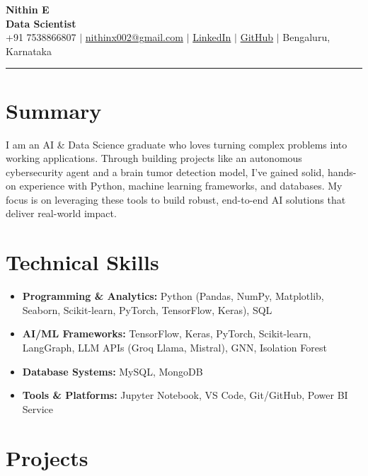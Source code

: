 \documentclass[letterpaper,10pt]{article}
\begin{document}
\begin{center}
    {\LARGE \bfseries Nithin E} \\[2pt]
    {\normalsize \bfseries Data Scientist} \\[3pt]
    \small
    +91 7538866807 $|$
    \href{mailto:nithinx002@gmail.com}{nithinx002@gmail.com} $|$
    \href{https://www.linkedin.com/in/nithin-devigner}{LinkedIn} $|$
    \href{https://github.com/codemonkx}{GitHub} $|$
    Bengaluru, Karnataka
\end{center}
\vspace{-2pt}
\hrule
\vspace{4pt}

\section*{Summary}
I am an AI \& Data Science graduate who loves turning complex problems into working applications. Through building projects like an autonomous cybersecurity agent and a brain tumor detection model, I've gained solid, hands-on experience with Python, machine learning frameworks, and databases. My focus is on leveraging these tools to build robust, end-to-end AI solutions that deliver real-world impact.

\vspace{2pt}

\section*{Technical Skills}
\begin{itemize}[leftmargin=*, noitemsep, topsep=1pt]
    \item \textbf{Programming \& Analytics:} Python (Pandas, NumPy, Matplotlib, Seaborn, Scikit-learn, PyTorch, TensorFlow, Keras), SQL
    \item \textbf{AI/ML Frameworks:} TensorFlow, Keras, PyTorch, Scikit-learn, LangGraph, LLM APIs (Groq Llama, Mistral), GNN, Isolation Forest
    \item \textbf{Database Systems:} MySQL, MongoDB
    \item \textbf{Tools \& Platforms:} Jupyter Notebook, VS Code, Git/GitHub, Power BI Service
\end{itemize}

\vspace{2pt}

\section*{Projects}
\end{document}
